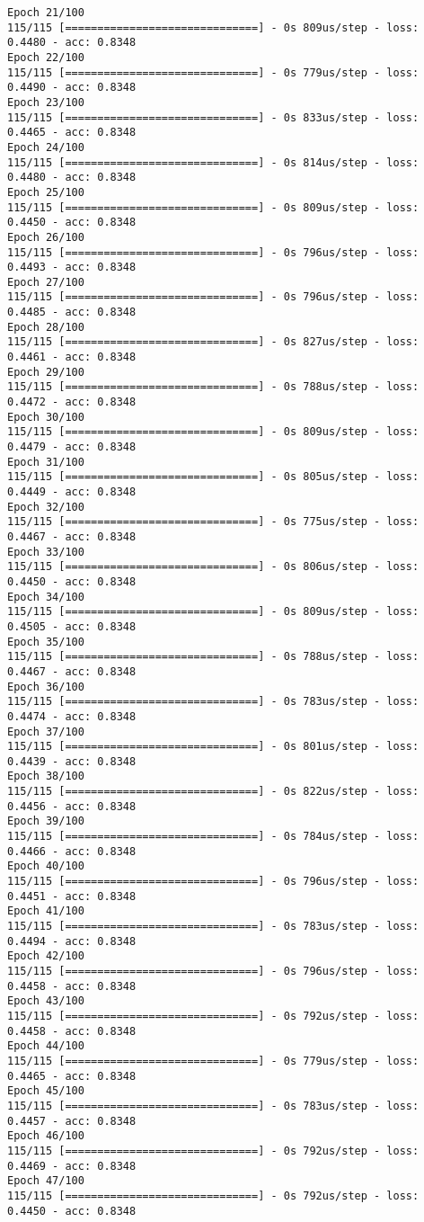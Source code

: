 \documentclass[11pt]{article}
\begin{document}
\begin{Verbatim}[commandchars=\\\{\}]
Epoch 21/100
115/115 [==============================] - 0s 809us/step - loss: 0.4480 - acc: 0.8348
Epoch 22/100
115/115 [==============================] - 0s 779us/step - loss: 0.4490 - acc: 0.8348
Epoch 23/100
115/115 [==============================] - 0s 833us/step - loss: 0.4465 - acc: 0.8348
Epoch 24/100
115/115 [==============================] - 0s 814us/step - loss: 0.4480 - acc: 0.8348
Epoch 25/100
115/115 [==============================] - 0s 809us/step - loss: 0.4450 - acc: 0.8348
Epoch 26/100
115/115 [==============================] - 0s 796us/step - loss: 0.4493 - acc: 0.8348
Epoch 27/100
115/115 [==============================] - 0s 796us/step - loss: 0.4485 - acc: 0.8348
Epoch 28/100
115/115 [==============================] - 0s 827us/step - loss: 0.4461 - acc: 0.8348
Epoch 29/100
115/115 [==============================] - 0s 788us/step - loss: 0.4472 - acc: 0.8348
Epoch 30/100
115/115 [==============================] - 0s 809us/step - loss: 0.4479 - acc: 0.8348
Epoch 31/100
115/115 [==============================] - 0s 805us/step - loss: 0.4449 - acc: 0.8348
Epoch 32/100
115/115 [==============================] - 0s 775us/step - loss: 0.4467 - acc: 0.8348
Epoch 33/100
115/115 [==============================] - 0s 806us/step - loss: 0.4450 - acc: 0.8348
Epoch 34/100
115/115 [==============================] - 0s 809us/step - loss: 0.4505 - acc: 0.8348
Epoch 35/100
115/115 [==============================] - 0s 788us/step - loss: 0.4467 - acc: 0.8348
Epoch 36/100
115/115 [==============================] - 0s 783us/step - loss: 0.4474 - acc: 0.8348
Epoch 37/100
115/115 [==============================] - 0s 801us/step - loss: 0.4439 - acc: 0.8348
Epoch 38/100
115/115 [==============================] - 0s 822us/step - loss: 0.4456 - acc: 0.8348
Epoch 39/100
115/115 [==============================] - 0s 784us/step - loss: 0.4466 - acc: 0.8348
Epoch 40/100
115/115 [==============================] - 0s 796us/step - loss: 0.4451 - acc: 0.8348
Epoch 41/100
115/115 [==============================] - 0s 783us/step - loss: 0.4494 - acc: 0.8348
Epoch 42/100
115/115 [==============================] - 0s 796us/step - loss: 0.4458 - acc: 0.8348
Epoch 43/100
115/115 [==============================] - 0s 792us/step - loss: 0.4458 - acc: 0.8348
Epoch 44/100
115/115 [==============================] - 0s 779us/step - loss: 0.4465 - acc: 0.8348
Epoch 45/100
115/115 [==============================] - 0s 783us/step - loss: 0.4457 - acc: 0.8348
Epoch 46/100
115/115 [==============================] - 0s 792us/step - loss: 0.4469 - acc: 0.8348
Epoch 47/100
115/115 [==============================] - 0s 792us/step - loss: 0.4450 - acc: 0.8348

\end{Verbatim}
\end{document}
